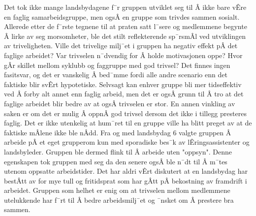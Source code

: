 Det tok ikke mange landsbydagene f¯r gruppen utviklet seg til Â ikke bare vÊre en faglig samarbeidsgruppe, men ogsÂ en gruppe som trivdes sammen sosialt. 
Allerede etter de f¯rste tegnene til at praten satt l¯sere og medlemmene begynte Â lirke av seg morsomheter, ble det stilt reflekterende sp¯rsmÂl ved utviklingen av triveligheten.
Ville det trivelige milj¯et i gruppen ha negativ effekt pÂ det faglige arbeidet?
Var trivselen n¯dvendig for Â holde motivasjonen oppe? 
Hvor gÂr skillet mellom syklubb og faggruppe med god trivsel?
Det finnes ingen fasitsvar, og det er vanskelig Â bed¯mme fordi alle andre scenario enn det faktiske blir svÊrt hypotetiske.
Selvsagt kan enhver gruppe bli mer tidseffektiv ved Â forby alt annet enn faglig arbeid, men det er ogsÂ grunn til Â tro at det faglige arbeidet blir bedre av at ogsÂ trivselen er stor.
En annen vinkling av saken er om det er mulig Â oppnÂ god trivsel dersom det ikke i tillegg presteres faglig.
Det er ikke utenkelig at hum¯ret til en gruppe ville ha blitt preget av at de faktiske mÂlene ikke ble nÂdd.
Fra og med landsbydag 6 valgte gruppen Â arbeide pÂ et eget grupperom kun med sporadiske bes¯k av lÊringsassistenter og landsbyleder.
Gruppen ble dermed flink til Â arbeide uten "oppsyn".
Denne egenskapen tok gruppen med seg da den senere ogsÂ ble n¯dt til Â m¯tes utenom oppsatte arbeidstider.
Det har aldri vÊrt diskutert at en landsbydag har bestÂtt av for mye tull og fritidsprat som har gÂtt pÂ bekostning av framdrift i arbeidet.
Gruppen som helhet er enig om at trivselen mellom medlemmene utelukkende har f¯rt til Â bedre arbeidsmilj¯et og ¯nsket om Â prestere bra sammen. 
























